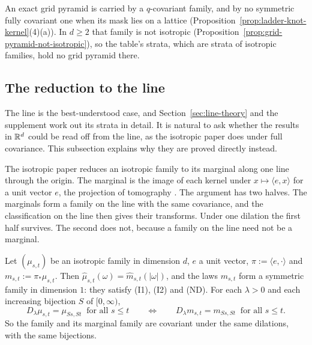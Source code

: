 An exact grid pyramid is carried by a $q$-covariant family, and by no symmetric fully covariant one
when its mask lies on a lattice (Proposition~\ref{prop:ladder-knot-kernel}(4)(a)). In $d \ge 2$ that family
is not isotropic (Proposition~\ref{prop:grid-pyramid-not-isotropic}), so the table's strata, which
are strata of isotropic families, hold no grid pyramid there.

\subsection{The reduction to the line}
\label{sec:pyramid-reduction}

The line is the best-understood case, and Section~\ref{sec:line-theory} and the supplement work out
its strata in detail. It is natural to ask whether the results in $\mathbb{R}^d$ could be read off from
the line, as the isotropic paper does under full covariance. This subsection explains why they are
proved directly instead.

The isotropic paper reduces an isotropic family to its marginal along one line through the origin.
The marginal is the image of each kernel under $x \mapsto \langle e, x\rangle$ for a unit vector
$e$, the projection of tomography . The argument has two halves. The
marginals form a family on the line with the same covariance, and the classification on the line
then gives their transforms. Under one dilation the first half survives. The second does not,
because a family on the line need not be a marginal.

\begin{lemma}
\label{lem:reduction-keeps-stratum}

Let $(\mu_{s,t})$ be an isotropic family in dimension $d$, $e$ a unit vector,
$\pi := \langle e, \cdot\rangle$ and $m_{s,t} := \pi_*\mu_{s,t}$. Then
$\widehat\mu_{s,t}(\omega) = \widehat m_{s,t}(|\omega|)$, and the laws $m_{s,t}$ form a symmetric
family in dimension $1$: they satisfy (I1), (I2) and (ND). For each $\lambda > 0$ and each increasing
bijection $S$ of $[0, \infty)$,
\[
  D_\lambda\mu_{s,t} = \mu_{Ss,St}\ \text{ for all } s \le t \qquad\Longleftrightarrow\qquad
  D_\lambda m_{s,t} = m_{Ss,St}\ \text{ for all } s \le t.
\]
So the family and its marginal family are covariant under the same dilations, with the same
bijections.
\end{lemma}

